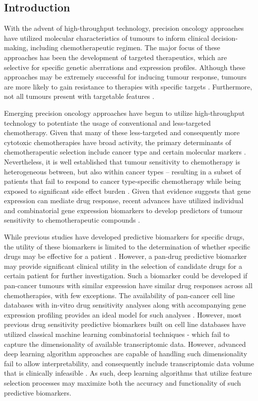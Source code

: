 \documentclass[10pt, letterpaper]{article}
\begin{document}
\begin{multicols}{2}
\section{Introduction}
With the advent of high-throughput technology, precision oncology approaches have utilized molecular characteristics of tumours to inform clinical decision-making, including chemotherapeutic regimen. The major focus of these approaches has been the development of targeted therapeutics, which are selective for specific genetic aberrations and expression profiles. Although these approaches may be extremely successful for inducing tumour response, tumours are more likely to gain resistance to therapies with specific targets \cite{small_mol}. Furthermore, not all tumours present with targetable features \cite{small_mol}.

Emerging precision oncology approaches have begun to utilize high-throughput technology to potentiate the usage of conventional and less-targeted chemotherapy. Given that many of these less-targeted and consequently more cytotoxic chemotherapies have broad activity, the primary determinants of chemotherapeutic selection include cancer type and certain molecular markers \cite{adverse}. Nevertheless, it is well established that tumour sensitivity to chemotherapy is heterogeneous between, but also within cancer types – resulting in a subset of patients that fail to respond to cancer type-specific chemotherapy while being exposed to significant side effect burden \cite{adjuvant}. Given that evidence suggests that gene expression can mediate drug response, recent advances have utilized individual and combinatorial gene expression biomarkers to develop predictors of tumour sensitivity to chemotherapeutic compounds \cite{integrated}.

While previous studies have developed predictive biomarkers for specific drugs, the utility of these biomarkers is limited to the determination of whether specific drugs may be effective for a patient \cite{drug_sense}. However, a pan-drug predictive biomarker may provide significant clinical utility in the selection of candidate drugs for a certain patient for further investigation. Such a biomarker could be developed if pan-cancer tumours with similar expression have similar drug responses across all chemotherapies, with few exceptions. The availability of pan-cancer cell line databases with in-vitro drug sensitivity analyses along with accompanying gene expression profiling provides an ideal model for such analyses \cite{gdsc}. However, most previous drug sensitivity predictive biomarkers built on cell line databases have utilized classical machine learning combinatorial techniques - which fail to capture the dimensionality of available transcriptomic data. However, advanced deep learning algorithm approaches are capable of handling such dimensionality fail to allow interpretability, and consequently include transcriptomic data volume that is clinically infeasible \cite{ml_oncol}. As such, deep learning algorithms that utilize feature selection processes may maximize both the accuracy and functionality of such predictive biomarkers.


\end{multicols}
\end{document}
